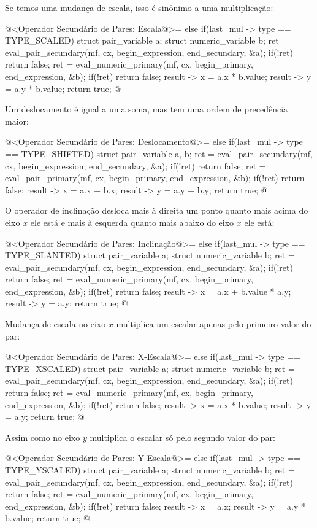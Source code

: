 Se temos uma mudança de escala, isso é sinônimo a uma multiplicação:

\iniciocodigo
@<Operador Secundário de Pares: Escala@>=
else if(last_mul -> type == TYPE_SCALED){
  struct pair_variable a;
  struct numeric_variable b;
  ret = eval_pair_secundary(mf, cx, begin_expression, end_secundary, &a);
  if(!ret)
    return false;
  ret = eval_numeric_primary(mf, cx, begin_primary, end_expression, &b);
  if(!ret)
    return false;
  result -> x = a.x * b.value;
  result -> y = a.y * b.value;
  return true;
}
@
\fimcodigo

Um deslocamento é igual a uma soma, mas tem uma ordem de precedência
maior:

\iniciocodigo
@<Operador Secundário de Pares: Deslocamento@>=
else if(last_mul -> type == TYPE_SHIFTED){
  struct pair_variable a, b;
  ret = eval_pair_secundary(mf, cx, begin_expression, end_secundary, &a);
  if(!ret)
    return false;
  ret = eval_pair_primary(mf, cx, begin_primary, end_expression, &b);
  if(!ret)
    return false;
  result -> x = a.x + b.x;
  result -> y = a.y + b.y;
  return true;
}
@
\fimcodigo

O operador de inclinação desloca mais à direita um ponto quanto mais
acima do eixo $x$ ele está e mais à esquerda quanto mais abaixo do
eixo $x$ ele está:

\iniciocodigo
@<Operador Secundário de Pares: Inclinação@>=
else if(last_mul -> type == TYPE_SLANTED){
  struct pair_variable a;
  struct numeric_variable b;
  ret = eval_pair_secundary(mf, cx, begin_expression, end_secundary, &a);
  if(!ret)
    return false;
  ret = eval_numeric_primary(mf, cx, begin_primary, end_expression, &b);
  if(!ret)
    return false;
  result -> x = a.x + b.value * a.y;
  result -> y = a.y;
  return true;
}
@
\fimcodigo

Mudança de escala no eixo $x$ multiplica um escalar apenas pelo
primeiro valor do par:

\iniciocodigo
@<Operador Secundário de Pares: X-Escala@>=
else if(last_mul -> type == TYPE_XSCALED){
  struct pair_variable a;
  struct numeric_variable b;
  ret = eval_pair_secundary(mf, cx, begin_expression, end_secundary, &a);
  if(!ret)
    return false;
  ret = eval_numeric_primary(mf, cx, begin_primary, end_expression, &b);
  if(!ret)
    return false;
  result -> x = a.x * b.value;
  result -> y = a.y;
  return true;
}
@
\fimcodigo

Assim como no eixo $y$ multiplica o escalar só pelo segundo valor do
par:

\iniciocodigo
@<Operador Secundário de Pares: Y-Escala@>=
else if(last_mul -> type == TYPE_YSCALED){
  struct pair_variable a;
  struct numeric_variable b;
  ret = eval_pair_secundary(mf, cx, begin_expression, end_secundary, &a);
  if(!ret)
    return false;
  ret = eval_numeric_primary(mf, cx, begin_primary, end_expression, &b);
  if(!ret)
    return false;
  result -> x = a.x;
  result -> y = a.y * b.value;
  return true;
}
@
\fimcodigo

